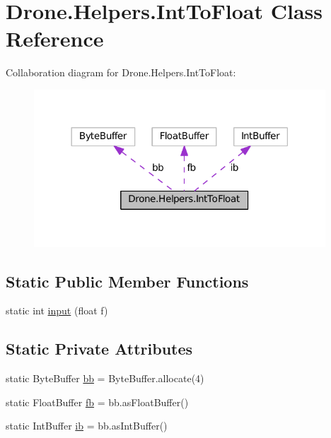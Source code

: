 \hypertarget{class_drone_1_1_helpers_1_1_int_to_float}{}\section{Drone.\+Helpers.\+Int\+To\+Float Class Reference}
\label{class_drone_1_1_helpers_1_1_int_to_float}


Collaboration diagram for Drone.\+Helpers.\+Int\+To\+Float\+:\nopagebreak
\begin{figure}[H]
\begin{center}
\leavevmode
\includegraphics[width=309pt]{class_drone_1_1_helpers_1_1_int_to_float__coll__graph}
\end{center}
\end{figure}
\subsection*{Static Public Member Functions}
\begin{DoxyCompactItemize}
\item 
static int \hyperlink{class_drone_1_1_helpers_1_1_int_to_float_a589f3f1e77517aecf73ad09d0a36d61e}{input} (float f)
\end{DoxyCompactItemize}
\subsection*{Static Private Attributes}
\begin{DoxyCompactItemize}
\item 
static Byte\+Buffer \hyperlink{class_drone_1_1_helpers_1_1_int_to_float_a199b65eafb9a7b41a8d810160265d9a4}{bb} = Byte\+Buffer.\+allocate(4)
\item 
static Float\+Buffer \hyperlink{class_drone_1_1_helpers_1_1_int_to_float_a3154ee6f1ff63a7fffd9dca883095cb3}{fb} = bb.\+as\+Float\+Buffer()
\item 
static Int\+Buffer \hyperlink{class_drone_1_1_helpers_1_1_int_to_float_af3a881fde7f3c3637248f94e69ec85a8}{ib} = bb.\+as\+Int\+Buffer()
\end{DoxyCompactItemize}


